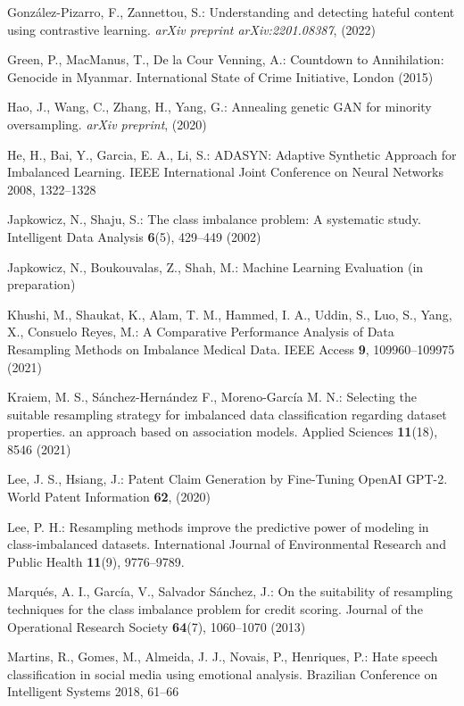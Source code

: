 \documentclass[runningheads]{llncs}
\begin{document}
\begin{thebibliography}{33}
González-Pizarro, F., Zannettou, S.: Understanding and detecting hateful content using contrastive learning. \emph{arXiv preprint arXiv:2201.08387}, (2022)

Green, P., MacManus, T., De la Cour Venning, A.: Countdown to Annihilation: Genocide in Myanmar. International State of Crime Initiative, London (2015)

Hao, J., Wang, C., Zhang, H., Yang, G.: Annealing genetic GAN for minority oversampling. \emph{arXiv preprint}, (2020)

He, H., Bai, Y., Garcia, E. A., Li, S.: ADASYN: Adaptive Synthetic Approach for Imbalanced Learning. IEEE International Joint Conference on Neural Networks 2008, 1322--1328

Japkowicz, N., Shaju, S.: The class imbalance problem: A systematic study. Intelligent Data Analysis \textbf{6}(5), 429--449 (2002)

Japkowicz, N., Boukouvalas, Z., Shah, M.: Machine Learning Evaluation (in preparation)

Khushi, M., Shaukat, K., Alam, T. M., Hammed, I. A., Uddin, S., Luo, S., Yang, X., Consuelo Reyes, M.: A Comparative Performance Analysis of Data Resampling Methods on Imbalance Medical Data. IEEE Access \textbf{9}, 109960--109975 (2021)

Kraiem, M. S., Sánchez-Hernández F., Moreno-García M. N.: Selecting the suitable resampling strategy for imbalanced data classification regarding dataset properties. an approach based on association models. Applied Sciences \textbf{11}(18), 8546 (2021)

Lee, J. S., Hsiang, J.: Patent Claim Generation by Fine-Tuning OpenAI GPT-2. World Patent Information \textbf{62}, (2020)

Lee, P. H.: Resampling methods improve the predictive power of modeling in class-imbalanced datasets. International Journal of Environmental Research and Public Health \textbf{11}(9), 9776--9789.

Marqués, A. I., García, V., Salvador Sánchez, J.: On the suitability of resampling techniques for the class imbalance problem for credit scoring. Journal of the Operational Research Society \textbf{64}(7), 1060--1070 (2013)

Martins, R., Gomes, M., Almeida, J. J., Novais, P., Henriques, P.: Hate speech classification in social media using emotional analysis. Brazilian Conference on Intelligent Systems 2018, 61--66


\end{thebibliography}
\end{document}
